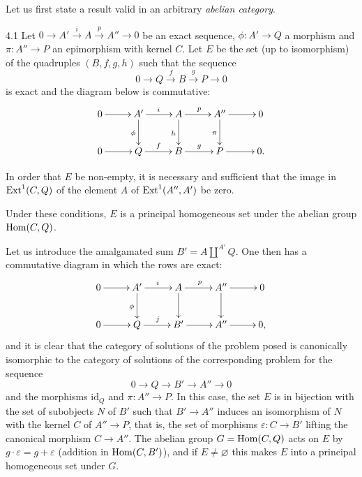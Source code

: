 \label{III.sec.4}

Let us first state a result valid in an arbitrary \emph{abelian category}.

\begin{lemma}{4.1}\label{III.4.1}
Let \(0\to A'\xrightarrow{i}A\xrightarrow{p}A''\to 0\) be an exact sequence,
\(\phi\colon A'\to Q\) a morphism and \(\pi\colon A''\to P\) an epimorphism
with kernel \(C\). Let \(E\) be the set (up to isomorphism) of the
quadruples \((B,f,g,h)\) such that the sequence
\[
0 \longrightarrow Q \xrightarrow{f} B \xrightarrow{g} P \longrightarrow 0
\]
is exact and the diagram below is commutative:
\[
\xymatrix@C=2.6em@R=2.4em{
0 \ar[r] & A' \ar[r]^{i} \ar[d]_{\phi}
  & A \ar[r]^{p} \ar[d]_{h}
  & A'' \ar[r] \ar[d]_{\pi} & 0 \\
0 \ar[r] & Q \ar[r]^{f}
  & B \ar[r]^{g}
  & P \ar[r] & 0.
}
\]
\begin{enumeratei}
\item In order that \(E\) be non-empty, it is necessary and sufficient that
the image in \(\operatorname{Ext}^{1}(C,Q)\) of the element \(A\) of \(\operatorname{Ext}^{1}(A'',A')\)
be zero.
\item Under these conditions, \(E\) is a principal homogeneous set under
the abelian group \(\operatorname{Hom}(C,Q)\).
\end{enumeratei}
\end{lemma}

Let us introduce the amalgamated sum \(B'=A\amalg^{A'}Q\). One then has a
commutative diagram in which the rows are exact:%
{\renewcommand{\thefootnote}{(74)}}
\[
\xymatrix@C=2.6em@R=2.4em{
0 \ar[r] & A' \ar[r]^{i} \ar[d]_{\phi}
  & A \ar[r]^{p} \ar[d]
  & A'' \ar[r] \ar[d] & 0 \\
0 \ar[r] & Q \ar[r]^{j}
  & B' \ar[r]
  & A'' \ar[r] & 0,
}
\]
and it is clear that the category of solutions of the problem posed is
canonically isomorphic to the category of solutions of the corresponding
problem for the sequence
\[
0 \longrightarrow Q \longrightarrow B' \longrightarrow A'' \longrightarrow 0
\]
and the morphisms \(\mathrm{id}_{Q}\) and \(\pi\colon A''\to P\).%
{\renewcommand{\thefootnote}{(75)}}
In this case, the set \(E\) is in bijection with the set of subobjects \(N\)
of \(B'\) such that \(B'\to A''\) induces an isomorphism of \(N\) with the
kernel \(C\) of \(A''\to P\), that is, the set of morphisms
\(\varepsilon\colon C\to B'\) lifting the canonical morphism \(C\to A''\).
The abelian group \(G=\operatorname{Hom}(C,Q)\) acts on \(E\) by
\(g\cdot\varepsilon=g+\varepsilon\) (addition in \(\operatorname{Hom}(C,B')\)), and if
\(E\neq\varnothing\) this makes \(E\) into a principal homogeneous set under
\(G\).

